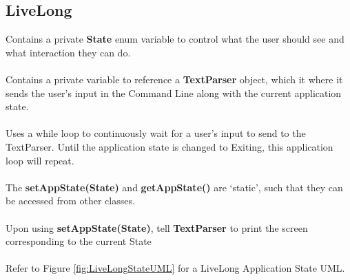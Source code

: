 \documentclass[12pt]{article}
\begin{document}
\subsection{LiveLong}
Contains a private \textbf{State} enum variable to control what the user should see and what interaction they can do. \\ \\
Contains a private variable to reference a \textbf{TextParser} object, which it where it sends the user's input in the Command Line along with the current application state. \\ \\
Uses a while loop to continuously wait for a user's input to send to the TextParser. Until the application state is changed to Exiting, this application loop will repeat. \\ \\
The \textbf{setAppState(State)} and \textbf{getAppState()} are `static', such that they can be accessed from other classes. \\ \\
Upon using \textbf{setAppState(State)}, tell \textbf{TextParser} to print the screen corresponding to the current State
\\ \\
Refer to Figure \ref{fig:LiveLongStateUML} for a LiveLong Application State UML.
\end{document}
